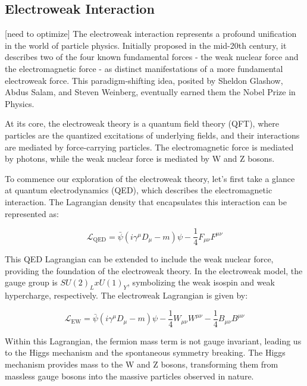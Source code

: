 \subsection{Electroweak Interaction}

[need to optimize]
The electroweak interaction represents a profound unification in the world of particle physics. Initially proposed in the mid-20th century, it describes two of the four known fundamental forces - the weak nuclear force and the electromagnetic force - as distinct manifestations of a more fundamental electroweak force. This paradigm-shifting idea, posited by Sheldon Glashow, Abdus Salam, and Steven Weinberg, eventually earned them the Nobel Prize in Physics.

At its core, the electroweak theory is a quantum field theory (QFT), where particles are the quantized excitations of underlying fields, and their interactions are mediated by force-carrying particles. The electromagnetic force is mediated by photons, while the weak nuclear force is mediated by W and Z bosons.

To commence our exploration of the electroweak theory, let's first take a glance at quantum electrodynamics (QED), which describes the electromagnetic interaction. The Lagrangian density that encapsulates this interaction can be represented as:

\begin{equation}
\mathcal{L}_{\text{QED}} = \bar{\psi} (i\gamma ^\mu D _\mu - m)\psi - \frac{1}{4} F _{\mu \nu} F ^{\mu \nu}
\end{equation}

This QED Lagrangian can be extended to include the weak nuclear force, providing the foundation of the electroweak theory. In the electroweak model, the gauge group is $SU(2)_L x U(1)_Y$, symbolizing the weak isospin and weak hypercharge, respectively. The electroweak Lagrangian is given by:

\begin{equation}
\mathcal{L}_{\text{EW}} = \bar{\psi} (i\gamma ^\mu D _\mu - m)\psi - \frac{1}{4} W _{\mu \nu} W ^{\mu \nu} - \frac{1}{4} B _{\mu \nu} B ^{\mu \nu}
\end{equation}

Within this Lagrangian, the fermion mass term is not gauge invariant, leading us to the Higgs mechanism and the spontaneous symmetry breaking. The Higgs mechanism provides mass to the W and Z bosons, transforming them from massless gauge bosons into the massive particles observed in nature. 

